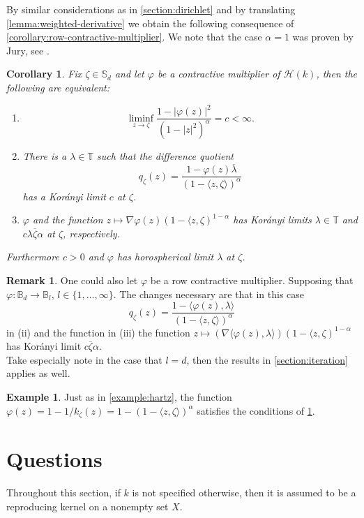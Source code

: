 \documentclass[leqno, final]{article}
\newtheorem{corollary}{Corollary}
\theoremstyle{definition}
\newtheorem{example}{Example}
\newtheorem{remark}{Remark}
\newcommand{\ball}{\mathbb{B}}
\newcommand{\torus}{\mathbb{T}}
\newcommand{\sphere}{\mathbb{S}}
\newcommand{\Hilbert}{\mathcal{H}}
\renewcommand{\phi}{\varphi}
\newcommand{\la}{\langle}
\newcommand{\ra}{\rangle}
\begin{document}
By similar considerations as in \cref{section:dirichlet} and by translating \cref{lemma:weighted-derivative}
we obtain the following consequence of \cref{corollary:row-contractive-multiplier}. We note that
the case $\alpha=1$ was proven by Jury, see \cite{jury_julia-caratheodory}.
\begin{corollary}\label{corollary:besov}
Fix $\zeta\in\sphere_d$ and let $\phi$ be a contractive multiplier of $\Hilbert(k)$, then the following
are equivalent: \begin{enumerate}[label=(\roman*)]
\item \[
	\liminf_{z\to\zeta}\frac{1-|\phi(z)|^2}{(1-|z|^2)^\alpha} = c < \infty.
\]
\item There is a $\lambda\in\torus$ such that the difference quotient \[
	q_\zeta(z) = \frac{1-\phi(z)\overline\lambda}{(1-\la z,\zeta\ra)^\alpha}
\]
has a Korányi limit $c$ at $\zeta$.
\item $\phi$ and the function $z\mapsto\nabla\phi(z)(1-\la z,\zeta)^{1-\alpha}$ has
Korányi limits $\lambda\in\torus$ and $c\lambda\overline\zeta\alpha$ at $\zeta$, respectively.
\end{enumerate}
Furthermore $c>0$ and $\phi$ has horospherical limit $\lambda$ at $\zeta$.
\end{corollary}
\begin{remark}
One could also let $\phi$ be a row contractive multiplier. Supposing that
$\phi:\ball_d\to\ball_l$, $l\in \{1,\ldots,\infty\}$. The changes necessary are that
in this case \[
	q_\zeta(z) = \frac{1-\la\phi(z),\lambda\ra}{(1-\la z,\zeta\ra)^\alpha}
\]
in (ii) and the function in (iii) the function
$z\mapsto(\nabla\la\phi(z),\lambda\ra)(1-\la z,\zeta)^{1-\alpha}$
has Korányi limit $c\overline\zeta\alpha$.
\\ Take especially note in the case that $l = d$, then the results in \cref{section:iteration}
applies as well.
\end{remark}

\begin{example}
Just as in \cref{example:hartz}, the function $\phi(z) = 1-1/k_\zeta(z) = 1 - (1-\la z,\zeta\ra)^\alpha$
satisfies the conditions of \cref{corollary:besov}.
\end{example}

\section{Questions}
Throughout this section, if $k$ is not specified otherwise, then it is
assumed to be a reproducing kernel on a nonempty set $X$.
\end{document}
